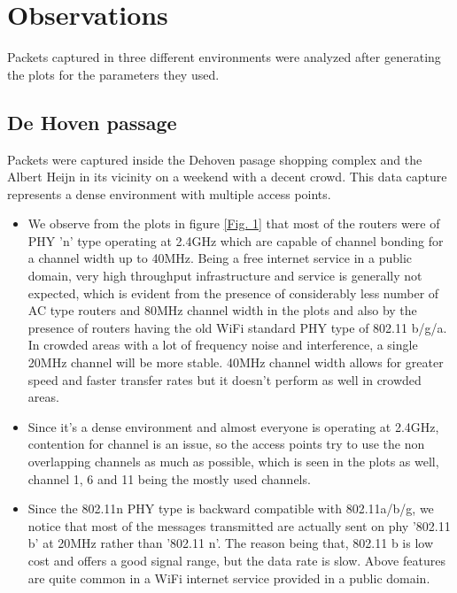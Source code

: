 \documentclass{article}
\begin{document}
\section{Observations}

Packets captured in three different environments were analyzed after generating the plots for the parameters they used.

\subsection{De Hoven passage}
Packets were captured inside the Dehoven pasage shopping complex and the Albert Heijn in its vicinity on a weekend with a decent crowd. This data capture represents a dense environment with multiple access points. 

\begin{itemize}

    \item We observe from the plots in figure \ref{Fig. 1} that most of the routers were of PHY 'n' type operating at 2.4GHz which are capable of channel bonding for a channel width up to 40MHz. Being a free internet service in a public domain, very high throughput infrastructure and service is generally not expected, which is evident from the presence of considerably less number of AC type routers and 80MHz channel width in the plots and also by the presence of routers having the old WiFi standard PHY type of 802.11 b/g/a. In crowded areas with a lot of frequency noise and interference, a single 20MHz channel will be more stable. 40MHz channel width allows for greater speed and faster transfer rates but it doesn't perform as well in crowded areas.
    
     \item Since it's a dense environment and almost everyone is operating at 2.4GHz, contention for channel is an issue, so the access points try to use the non overlapping channels as much as possible, which is seen in the plots as well, channel 1, 6 and 11 being the mostly used channels. 
    
    \item Since the 802.11n PHY type is backward compatible with 802.11a/b/g, we notice that most of the messages transmitted are actually sent on phy '802.11 b' at 20MHz rather than '802.11 n'. The reason being that, 802.11 b is low cost and offers a good signal range, but the data rate is slow. Above features are quite common in a WiFi internet service provided in a public domain.
    
    
\end{itemize}
\end{document}
